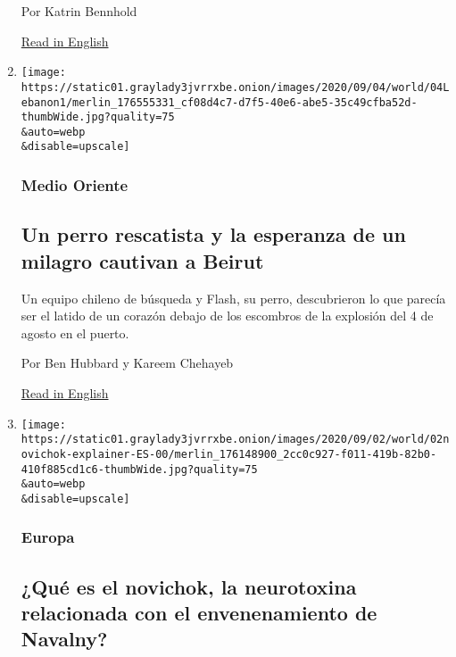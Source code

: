 \begin{enumerate}
  Por Katrin Bennhold

  \href{https://www.nytimes3xbfgragh.onion/2020/09/07/world/europe/germany-trump-far-right.html}{Read
  in English}
\item
  \href{/es/2020/09/04/espanol/mundo/libano-rescate-topos.html}{}

  \texttt{[image: https://static01.graylady3jvrrxbe.onion/images/2020/09/04/world/04Lebanon1/merlin\_176555331\_cf08d4c7-d7f5-40e6-abe5-35c49cfba52d-thumbWide.jpg?quality=75\\\&auto=webp\\\&disable=upscale]}

  \hypertarget{medio-oriente}{%
  \subsubsection{Medio Oriente}\label{medio-oriente}}

  \hypertarget{un-perro-rescatista-y-la-esperanza-de-un-milagro-cautivan-a-beirut}{%
  \subsection{Un perro rescatista y la esperanza de un milagro cautivan
  a
  Beirut}\label{un-perro-rescatista-y-la-esperanza-de-un-milagro-cautivan-a-beirut}}

  Un equipo chileno de búsqueda y Flash, su perro, descubrieron lo que
  parecía ser el latido de un corazón debajo de los escombros de la
  explosión del 4 de agosto en el puerto.

  Por Ben Hubbard y Kareem Chehayeb

  \href{https://www.nytimes3xbfgragh.onion/2020/09/04/world/middleeast/Beirut-survivor-search.html}{Read
  in English}
\item
  \href{/es/2020/09/02/espanol/mundo/novichok-que-es.html}{}

  \texttt{[image: https://static01.graylady3jvrrxbe.onion/images/2020/09/02/world/02novichok-explainer-ES-00/merlin\_176148900\_2cc0c927-f011-419b-82b0-410f885cd1c6-thumbWide.jpg?quality=75\\\&auto=webp\\\&disable=upscale]}

  \hypertarget{europa-5}{%
  \subsubsection{Europa}\label{europa-5}}

  \hypertarget{quuxe9-es-el-novichok-la-neurotoxina-relacionada-con-el-envenenamiento-de-navalny}{%
  \subsection{¿Qué es el novichok, la neurotoxina relacionada con el
  envenenamiento de
  Navalny?}\label{quuxe9-es-el-novichok-la-neurotoxina-relacionada-con-el-envenenamiento-de-navalny}}


\end{enumerate}
